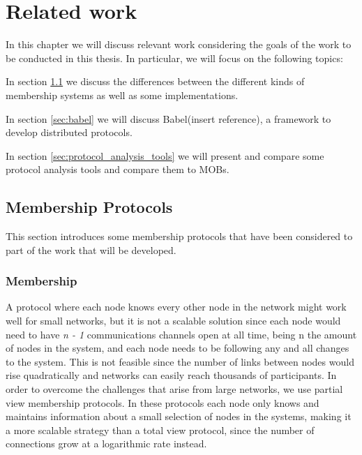 
%

\chapter{Related work}
\label{cha:related_work}

In this chapter we will discuss relevant work considering the goals of the work
to be conducted in this thesis. In particular, we will focus on the following topics:

In section \ref{sec:membership_protocols} we discuss the differences between
the different kinds of membership systems as well as some implementations.

In section \ref{sec:babel} we will discuss Babel(insert reference), a framework
to develop distributed protocols.

In section \ref{sec:protocol_analysis_tools} we will present and compare some 
protocol analysis tools and compare them to MOBs.

\section{Membership Protocols}
\label{sec:membership_protocols}

This section introduces some membership protocols that have been considered to
part of the work that will be developed.


\subsection{Membership}
\label{sub:membership}

A protocol where each node knows every other node in the network might work well
for small networks, but it is not a scalable solution since each node would need
to have \textit{n - 1} communications channels open at all time, being n the
amount of nodes in the system, and each node needs to be following any and all
changes to the system. This is not feasible since the number of links between
nodes would rise quadratically and networks can easily reach thousands of
participants. In order to overcome the challenges that arise from large networks,
we use partial view membership protocols. In these protocols each node only knows
and maintains information about a small selection of nodes in the systems,
making it a more scalable strategy than a total view protocol, since
the number of connections grow at a logarithmic rate instead.


